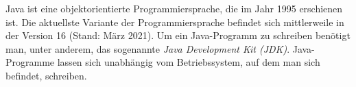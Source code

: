 Java ist eine objektorientierte Programmiersprache, die im Jahr 1995 erschienen ist. Die aktuellste Variante der Programmiersprache befindet sich mittlerweile in der Version 16 (Stand: März 2021). Um ein Java-Programm zu schreiben benötigt man, unter anderem, das sogenannte \emph{Java Development Kit (JDK)}. Java-Programme lassen sich unabhängig vom Betriebssystem, auf dem man sich befindet, schreiben.